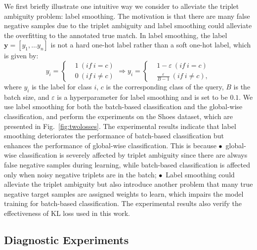 \documentclass[sigconf]{acmart}
\begin{document}
We first briefly illustrate one intuitive way we consider to alleviate the triplet ambiguity problem: label smoothing. The motivation is that there are many false negative samples due to the triplet ambiguity and label smoothing could alleviate the overfitting to the annotated true match. In label smoothing, the label $\bm{y} = [y_1, \dots y_n]$ is not a hard one-hot label rather than a soft one-hot label, which is given by:
\begin{equation}
y_i = 
\begin{cases}
&1~(if~i =  c) \\
&0~(if~i\ne c)
\end{cases}
\Longrightarrow 
y_i = 
\begin{cases}
&1-\varepsilon ~(if~i =  c) \\
&\frac{\varepsilon}{B-1} ~(if~i\ne c),
\end{cases}
\end{equation}
where $y_i$ is the label for class $i$, $c$ is the corresponding class of the query, $B$ is the batch size, and $\varepsilon$ is a hyperparameter for label smoothing and is set to be $0.1$. We use label smoothing for both the batch-based classification and the global-wise classification, and perform the experiments on the Shoes dataset, which are presented in Fig.~\ref{fig:twolosses}. The experimental results indicate that label smoothing deteriorates the performance of batch-based classification but enhances the performance of global-wise classification. This is because $\bullet$~global-wise classification is severely affected by triplet ambiguity since there are always false negative samples during learning, while batch-based classification is affected only when noisy negative triplets are in the batch; $\bullet$~Label smoothing could alleviate the triplet ambiguity but also introduce another problem that many true negative target samples are assigned weights to learn, which impairs the model training for batch-based classification. The experimental results also verify the effectiveness of KL loss used in this work.


\subsection{Diagnostic Experiments}
\label{subsec:diagnostic}
\end{document}
